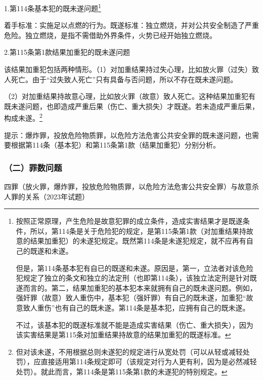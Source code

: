 1.第114条基本犯的既未遂问题\footnote{按照正常原理，产生危险是故意犯罪的成立条件，造成实害结果才是既遂条件，所以，第114条是关于危险犯的规定，是第115条第1款（对加重结果持故意的结果加重犯）的未遂犯规定。既然第114条是未遂犯规定，就不应再有自己的既遂和未遂。

但是，第114条基本犯有自已的既遂和未遂。原因是，第一，立法者对该危险犯规定了独立的条文和独立的法定刑（也即第114条），该独立法定刑是针对既遂而言的。第二，结果加重犯的基本犯本来就拥有自己的既未遂问题。例如，强奸罪（故意）致人重伤中，基本犯（强奸罪）有自己的既未遂，加重犯“故意致人重伤”也有自己的既未遂。第114条是基本犯，应拥有自己的既未遂。

不过，该基本犯的既遂标准就不能是造成实害结果（伤亡、重大损失），因为该实害结果是第115条对加重结果持故意的结果加重犯的既遂标准。}

着手标准：实施足以点燃的行为。既遂标准：独立燃烧，并对公共安全制造了严重危险。独立燃烧，是指不需借助外界条件，火势已经开始独立燃烧。

2.第115条第1款结果加重犯的既未遂问题

该结果加重犯包括两种情形。（1）对加重结果持过失心理，比如放火罪（过失）致人死亡。由于“过失致人死亡”只有具备与否问题，所以不存在既未遂问题。

（2）对加重结果持故意心理，比如放火罪（故意）致人死亡。这种结果加重犯有既未遂问题，也即造成严重后果（伤亡、重大损失）才既遂。若未造成严重后果，构成未遂。\footnote{但对该未遂，不用根据总则未遂犯的规定进行从宽处罚（可以从轻或减轻处罚），应直接适用第114条规定即可（该规定对行为人更有利，因为是必然减轻处罚）。就此而言，第114条是第115条第1款的未遂犯的特别规定。}

提示：爆炸罪，投放危险物质罪，以危险方法危害公共安全罪的既未遂问题，也需要根据第114条（基本犯）和第115条第1款（结果加重犯）分别分析。

\subsubsection*{（二）罪数问题}

四罪（放火罪，爆炸罪，投放危险物质罪，以危险方法危害公共安全罪）与故意杀人罪的关系（2023年试题）

